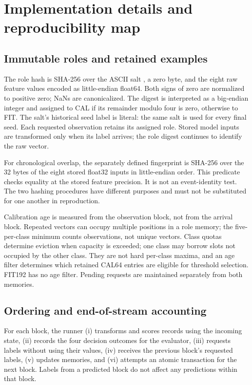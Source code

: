 \section{Implementation details and reproducibility map}
\label{sec:implementation}
\subsection{Immutable roles and retained examples}
The role hash is SHA-256 over the ASCII salt , a zero byte, and the eight raw feature values encoded as little-endian float64. Both signs of zero are normalized to positive zero; NaNs are canonicalized. The digest is interpreted as a big-endian integer and assigned to CAL if its remainder modulo four is zero, otherwise to FIT. The salt's historical seed label is literal: the same salt is used for every final seed. Each requested observation retains its assigned role. Stored model inputs are transformed only when its label arrives; the role digest continues to identify the raw vector.

For chronological overlap, the separately defined fingerprint is SHA-256 over the 32 bytes of the eight stored float32 inputs in little-endian order. This predicate checks equality at the stored feature precision. It is not an event-identity test. The two hashing procedures have different purposes and must not be substituted for one another in reproduction.

Calibration age is measured from the observation block, not from the arrival block. Repeated vectors can occupy multiple positions in a role memory; the five-per-class minimum counts observations, not unique vectors. Class quotas determine eviction when capacity is exceeded; one class may borrow slots not occupied by the other class. They are not hard per-class maxima, and an age filter determines which retained CAL64 entries are eligible for threshold selection. FIT192 has no age filter. Pending requests are maintained separately from both memories.

\subsection{Ordering and end-of-stream accounting}
For each block, the runner (i) transforms and scores records using the incoming state, (ii) records the four decision outcomes for the evaluator, (iii) requests labels without using their values, (iv) receives the previous block's requested labels, (v) updates memories, and (vi) attempts an atomic transaction for the next block. Labels from a predicted block do not affect any predictions within that block.

